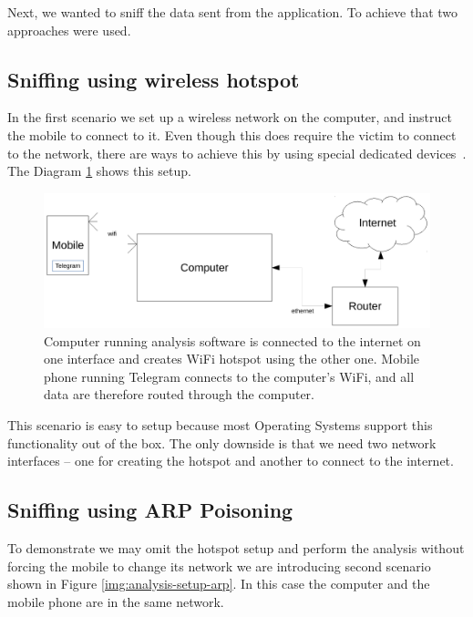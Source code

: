 \documentclass[thesis=M,english]{FITthesis}[2012/10/20]
\begin{document}
Next, we wanted to sniff the data sent from the application. To achieve that two approaches were used.

\subsection{Sniffing using wireless hotspot}

In the first scenario we set up a wireless network on the computer, and instruct the mobile to connect to it. Even though this does require the victim to connect to the network, there are ways to achieve this by using special dedicated devices~\cite{pineapple}. The Diagram \ref{img:analysis-setup-hotspot} shows this setup.

\begin{figure}[htb]
	\centering
	\includegraphics[width=1\textwidth]{setup-hotspot.pdf}
	\caption[Analysis setup 1]{Computer running analysis software is connected to the internet on one interface and creates WiFi hotspot using the other one. Mobile phone running Telegram connects to the computer's WiFi, and all data are therefore routed through the computer.}
	\label{img:analysis-setup-hotspot}
\end{figure}

This scenario is easy to setup because most Operating Systems support this functionality out of the box. The only downside is that we need two network interfaces -- one for creating the hotspot and another to connect to the internet.


\subsection{Sniffing using ARP Poisoning}

To demonstrate we may omit the hotspot setup and perform the analysis without forcing the mobile to change its network we are introducing second scenario shown in Figure \ref{img:analysis-setup-arp}. In this case the computer and the mobile phone are in the same network.
\end{document}
